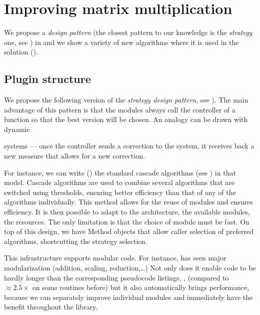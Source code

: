 \section{Improving \linbox matrix multiplication}\label{sec:matmul}
%
We propose a \emph{design pattern} (the closest pattern to our knowledge is the
\emph{strategy} one, see \cite[Fig 2.]{Cung:2006:TC}) in  and
we show a variety of new algorithms where it is used in the \mul  solution
().
%
\subsection{Plugin structure}\label{ssec:plugin}
%
We propose the following version of the \emph{strategy design pattern}, 
see \cite[Fig 2.]{Cung:2006:TC}).
The main advantage of this pattern is that the modules always call 
the controller of a function so that the best version will be chosen. 
An analogy can be drawn with dynamic

systems --- once the controller sends a correction to the system, it receives
back a new measure that allows for a new correction.
%
\par
%
%
%
%
For instance, we can write () the standard cascade algorithms
(see \cite{Dumas:2008:Flas}) in that model. Cascade algorithms are used to combine
several algorithms that are switched using thresholds, ensuring better
efficiency than that of any of the algorithms individually.
%
%
%
This method allows for the reuse of modules and ensures efficiency.
It is then possible to adapt to the architecture, the available modules,
the resources. The only limitation is that the choice of module
must be fast.
%
%
On top of this design, we have Method objects that allow caller selection
of preferred algorithms, shortcutting the strategy selection.
%

%
%
\par
%
This infrastructure supports modular code. For instance,
\fflasffpack has seen major  modularization (addition, scaling,
reduction,\ldots) Not only does it enable code to be hardly longer than
the corresponding pseudocode listings, \cite{Boyer:2009:sched}, (compared to
$\approx 2.5\times$ on some routines before) but it also automatically brings
performance, because we can separately improve individual modules and immediately have the benefit throughout the library.
%
